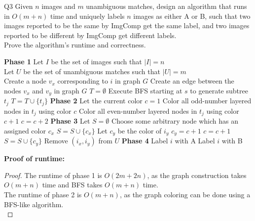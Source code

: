 \begin{problem}
  {Q3}
  Given $n$ images and $m$ unambiguous matches, design an algorithm that runs in $O(m+n)$ time and
  uniquely labels $n$ images as either A or B, such that two images reported to be the same by
  ImgComp get the same label, and two images reported to be different by ImgComp get different labels. \\
  Prove the algorithm's runtime and correctness. \\
  \begin{algorithmic}[1]
    \STATE \textbf{Phase 1}
    \STATE Let $I$ be the set of images such that $|I| = n$ \\
    \STATE Let $U$ be the set of unambiguous matches such that $|U| = m$ \\
    \STATE Create a node $v_x$ corresponding to $i$ in graph $G$
    \ENDFOR
    \STATE Create an edge between the nodes $v_x$ and $v_y$ in graph $G$
    \ENDIF
    \ENDFOR
    \STATE $T = \emptyset$
    \STATE Execute BFS starting at $s$ to generate subtree $t_j$
    \STATE $T = T \cup \{t_j\}$
    \ENDWHILE
    \STATE \textbf{Phase 2}
    \STATE Let the current color $c = 1$
      \STATE Color all odd-number layered nodes in $t_j$ using color $c$
      \STATE Color all even-number layered nodes in $t_j$ using color $c + 1$
      \STATE $c = c + 2$
    \ENDIF
    \ENDFOR
    \STATE \textbf{Phase 3}
    \STATE Let $S = \emptyset$
    \STATE Choose some arbitrary node which has an assigned color $c_x$
    \STATE $S = S \cup \{c_x\}$
    \STATE Let $c_y$ be the color of $i_y$
      \STATE $c_y = c + 1$
      \STATE $c = c + 1$
    \ENDIF
    \STATE $S = S \cup \{c_y\}$
    \STATE Remove $(i_x, i_y)$ from $U$
    \ENDIF
    \ENDFOR
    \STATE \textbf{Phase 4}
    \STATE Label $i$ with A
    \ELSE
    \STATE Label $i$ with B
    \ENDIF
    \ENDFOR
  \end{algorithmic}
  \textbf{Proof of runtime: }
  \begin{proof}
    The runtime of phase 1 is $O(2m + 2n)$, as the graph construction takes $O(m+n)$ time and BFS takes $O(m+n)$ time. \\
    The runtime of phase 2 is $O(m+n)$, as the graph coloring can be done using a BFS-like algorithm. \\

\end{proof}
\end{problem}
